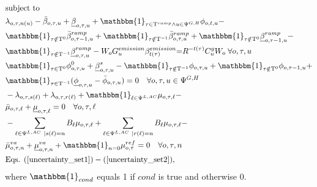\documentclass[final]{IEEEtran}
\newcommand{\Tau}{\mathrm{T}}
\begin{document}
\begin{align}
&\text{subject to} \nonumber \\
&\lambda_{o, \tau, n(u)} - \bar{\beta}_{o, \tau, u} + \underline{\beta}_{o, \tau, u} + \mathbbm{1}_{\tau \in \Tau^{ramp} \land u \in \Psi^{G, H}} \phi_{o, t, u} - \nonumber \\
&\mathbbm{1}_{\tau \notin \Tau^0} \bar{\beta}_{o, \tau - 1, u}^{ramp} + \mathbbm{1}_{\tau \notin \Tau^{-1}} \bar{\beta}_{o, \tau, u}^{ramp} + \mathbbm{1}_{\tau \notin \Tau^0} \underline{\beta}_{o, \tau - 1, u}^{ramp} - \nonumber \\
&\label{sub_constr1}\mathbbm{1}_{\tau \notin \Tau^{-1}} \underline{\beta}_{o, \tau, u}^{ramp} - W_o G_{u}^{emission} \beta_{t(\tau)}^{emission} {=} R^{-t(\tau)} C^g_{u}  W_o \; \forall o, \tau, u \\
&\mathbbm{1}_{\tau \in \Tau^0} \phi_{o, \tau, u}^{0} + \underline{\beta}_{o, \tau, u}^s - \mathbbm{1}_{\tau \notin \Tau^{-1}} \phi_{o, \tau, u} + \mathbbm{1}_{\tau \notin \Tau^0} \phi_{o, \tau - 1, u} + \nonumber \\
&\mathbbm{1}_{\tau \in \Tau^{-1}} (\underline{\phi}_{o, \tau, u} - \bar{\phi}_{o, \tau, u}) = 0 \quad \forall o, \tau, u \in \Psi^{G, H} \\
&-\lambda_{o, \tau, s(\ell)} + \lambda_{o, \tau, r(\ell)} + \mathbbm{1}_{\ell \in \Psi^{L,AC}} \mu_{o, \tau, \ell} - \nonumber \\
&\bar{\mu}_{o, \tau, \ell} + \underline{\mu}_{o, \tau, \ell} = 0 \quad \forall o, \tau, \ell \\
&-\sum\limits_{\ell \in \Psi^{L,AC} | s(\ell) = n} B_\ell \mu_{o, \tau, \ell} + \sum\limits_{\ell \in \Psi^{L,AC} | r(\ell) = n} B_\ell \mu_{o, \tau, \ell} - \nonumber \\
&\bar{\mu}^{va}_{o, \tau, n} + \underline{\mu}^{va}_{o, \tau, n} + \mathbbm{1}_{n = 0} \mu^{ref}_{o, \tau} = 0 \quad \forall o, \tau, n \\
&\label{sub_last}\text{Eqs. } (\ref{uncertainty_set1})-(\ref{uncertainty_set2}),
\end{align}
where $\mathbbm{1}_{cond}$ equals 1 if $cond$ is true and otherwise 0.
\end{document}
